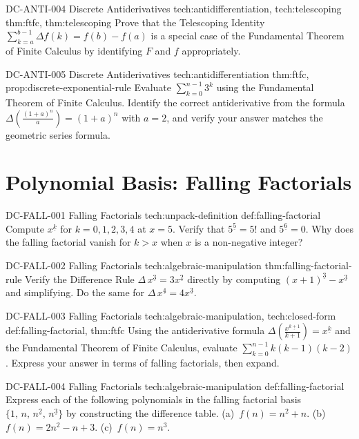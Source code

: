 \exstubgenfull
  {DC-ANTI-004}
  {Discrete Antiderivatives}
  {tech:antidifferentiation, tech:telescoping}
  {thm:ftfc, thm:telescoping}
  {Prove that the Telescoping Identity
  \(\displaystyle\sum_{k=a}^{b-1}\Delta f(k) = f(b) - f(a)\)
  is a special case of the Fundamental Theorem of Finite Calculus by
  identifying \(F\) and \(f\) appropriately.}

\exstubgenfull
  {DC-ANTI-005}
  {Discrete Antiderivatives}
  {tech:antidifferentiation}
  {thm:ftfc, prop:discrete-exponential-rule}
  {Evaluate \(\displaystyle\sum_{k=0}^{n-1} 3^k\) using the Fundamental
  Theorem of Finite Calculus. Identify the correct antiderivative from
  the formula \(\Delta\!\left(\tfrac{(1+a)^n}{a}\right) = (1+a)^n\) with
  \(a = 2\), and verify your answer matches the geometric series formula.}

\section*{Polynomial Basis: Falling Factorials}

\exstubgenfull
  {DC-FALL-001}
  {Falling Factorials}
  {tech:unpack-definition}
  {def:falling-factorial}
  {Compute \(x^{\underline{k}}\) for \(k = 0, 1, 2, 3, 4\) at \(x = 5\).
  Verify that \(5^{\underline{5}} = 5!\) and \(5^{\underline{6}} = 0\).
  Why does the falling factorial vanish for \(k > x\) when \(x\) is a
  non-negative integer?}

\exstubgenfull
  {DC-FALL-002}
  {Falling Factorials}
  {tech:algebraic-manipulation}
  {thm:falling-factorial-rule}
  {Verify the Difference Rule \(\Delta\,x^{\underline{3}} = 3x^{\underline{2}}\)
  directly by computing \((x+1)^{\underline{3}} - x^{\underline{3}}\) and
  simplifying. Do the same for \(\Delta\,x^{\underline{4}} = 4x^{\underline{3}}\).}

\exstubgenfull
  {DC-FALL-003}
  {Falling Factorials}
  {tech:algebraic-manipulation, tech:closed-form}
  {def:falling-factorial, thm:ftfc}
  {Using the antiderivative formula \(\Delta\!\left(\tfrac{x^{\underline{k+1}}}{k+1}\right) = x^{\underline{k}}\)
  and the Fundamental Theorem of Finite Calculus, evaluate
  \(\displaystyle\sum_{k=0}^{n-1} k(k-1)(k-2)\).
  Express your answer in terms of falling factorials, then expand.}

\exstubgenfull
  {DC-FALL-004}
  {Falling Factorials}
  {tech:algebraic-manipulation}
  {def:falling-factorial}
  {Express each of the following polynomials in the falling factorial basis
  \(\{1,\, n,\, n^{\underline{2}},\, n^{\underline{3}}\}\) by constructing
  the difference table.
  (a)~\(f(n) = n^2 + n\).
  (b)~\(f(n) = 2n^2 - n + 3\).
  (c)~\(f(n) = n^3\).}

